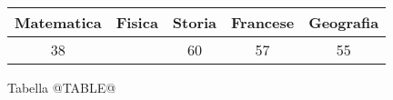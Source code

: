 \begin{tabular}{ | c | c | c | c | c | }
\hline
Matematica & Fisica & Storia & Francese & Geografia \\
\hline
38 &  & 60 & 57 & 55 \\
\hline
\end{tabular}
\vspace{.1cm}

Tabella @TABLE@
\vspace{.2cm}
